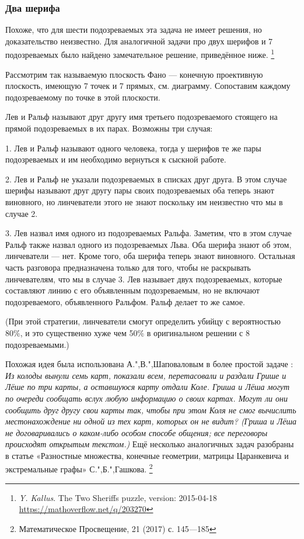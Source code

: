 \documentclass[twoside]{book}
\begin{document}
\subsubsection*{Два шерифа}
Похоже, что для шести подозреваемых эта задача не имеет решения, но доказательство неизвестно.
Для аналогичной задачи про двух шерифов и 7 подозреваемых было найдено замечательное решение,
приведённое ниже.%
\footnote{\emph{Y. Kallus}. The Two Sheriffs puzzle, version: 2015-04-18 \url{https://mathoverflow.net/q/203270}}

Рассмотрим так называемую плоскость Фано --- конечную проективную плоскость, имеющую 7 точек и 7 прямых, см. диаграмму.
Сопоставим каждому подозреваемому по точке в этой плоскости.

Лев и Ральф называют друг другу имя третьего подозреваемого стоящего на прямой подозреваемых в их парах.
Возможны три случая:

1. Лев и Ральф называют одного человека, тогда у шерифов те же пары подозреваемых и им необходимо вернуться к сыскной работе.

2. Лев и Ральф не указали подозреваемых в списках друг друга.
В этом случае шерифы называют друг другу пары своих подозреваемых оба теперь знают виновного, но линчеватели этого не знают поскольку им неизвестно что мы в случае 2.

3. Лев назвал имя одного из подозреваемых Ральфа.
Заметим, что в этом случае Ральф также назвал одного из подозреваемых Льва.
Оба шерифа знают об этом, линчеватели --- нет.
Кроме того, оба шерифа теперь знают виновного.
Остальная часть разговора предназначена только для того, чтобы не раскрывать линчевателям, что мы в случае 3. Лев называет двух подозреваемых, которые составляют линию с его объявленным подозреваемым, но не включают подозреваемого, объявленного Ральфом.
Ральф делает то же самое.

(При этой стратегии, линчеватели смогут определить убийцу с вероятностью 80\%, и это существенно хуже чем 50\% в оригинальном решении с 8 подозреваемыми.)

Похожая идея была использована А.",В.",Шаповаловым в более простой задаче \cite[№ 105089]{problems}: 
\emph{Из колоды вынули семь карт, показали всем, перетасовали и раздали Грише и Лёше
по три карты, а оставшуюся карту отдали Коле.
Гриша и Лёша могут по очереди сообщать вслух любую информацию о своих картах.
Могут ли они сообщить друг другу свои карты так, чтобы при этом Коля не смог
вычислить местонахождение ни одной из тех карт, которых он не видит?
(Гриша и Лёша не договаривались о каком-либо особом способе общения;
все переговоры происходят открытым текстом.)}
Ещё несколько аналогичных задач разобраны в статье «Разностные множества, конечные геометрии, матрицы Царанкевича и экстремальные графы» С.",Б.",Гашкова.%
\footnote{Математическое Просвещение, 21 (2017) с. 145---185}
\end{document}
